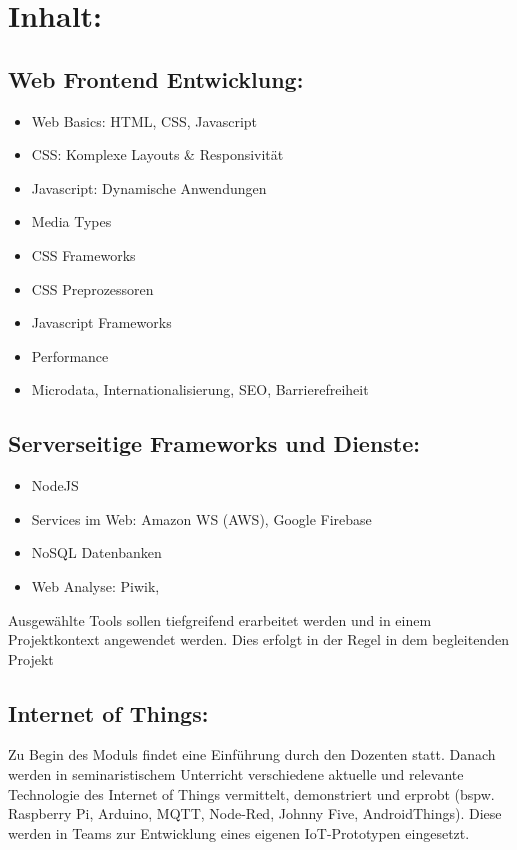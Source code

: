 \section*{Inhalt:}\label{inhalt-26}

\subsection*{Web Frontend
Entwicklung:}\label{web-frontend-entwicklung-1}

\begin{itemize}
\item
  Web Basics: HTML, CSS, Javascript
\item
  CSS: Komplexe Layouts \& Responsivität
\item
  Javascript: Dynamische Anwendungen
\item
  Media Types
\item
  CSS Frameworks
\item
  CSS Preprozessoren
\item
  Javascript Frameworks
\item
  Performance
\item
  Microdata, Internationalisierung, SEO, Barrierefreiheit
\end{itemize}

\subsection*{Serverseitige Frameworks und
Dienste:}\label{serverseitige-frameworks-und-dienste-1}

\begin{itemize}
\item
  NodeJS
\item
  Services im Web: Amazon WS (AWS), Google Firebase
\item
  NoSQL Datenbanken
\item
  Web Analyse: Piwik,
\end{itemize}

Ausgewählte Tools sollen tiefgreifend erarbeitet werden und in einem
Projektkontext angewendet werden. Dies erfolgt in der Regel in dem
begleitenden Projekt

\subsection*{Internet of Things:}\label{internet-of-things-1}

Zu Begin des Moduls findet eine Einführung durch den Dozenten statt.
Danach werden in seminaristischem Unterricht verschiedene aktuelle und
relevante Technologie des Internet of Things vermittelt, demonstriert
und erprobt (bspw. Raspberry Pi, Arduino, MQTT, Node-Red, Johnny Five,
AndroidThings). Diese werden in Teams zur Entwicklung eines eigenen
IoT-Prototypen eingesetzt.

